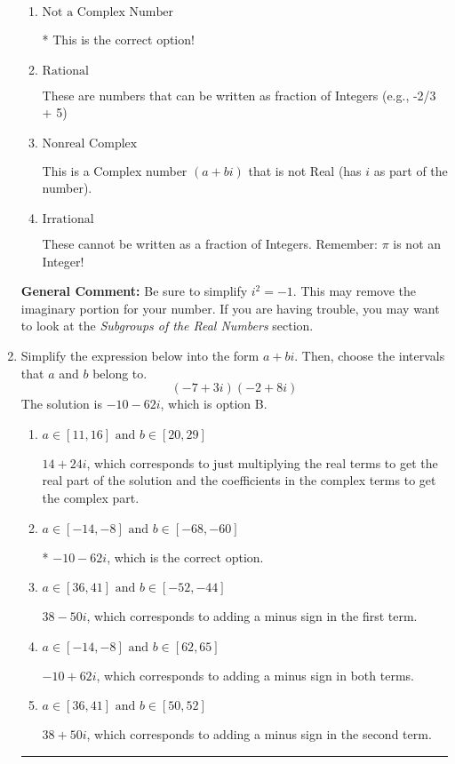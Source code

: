 \documentclass{extbook}[14pt]
\newcommand{\litem}[1]{\item #1

\rule{\textwidth}{0.4pt}}
\begin{document}
\begin{enumerate}
{\begin{enumerate}[label=\Alph*.]
This is a Complex number $(a+bi)$ that \textbf{only} has an imaginary part like $2i$.
\item \( \text{Not a Complex Number} \)

* This is the correct option!
\item \( \text{Rational} \)

These are numbers that can be written as fraction of Integers (e.g., -2/3 + 5)
\item \( \text{Nonreal Complex} \)

This is a Complex number $(a+bi)$ that is not Real (has $i$ as part of the number).
\item \( \text{Irrational} \)

These cannot be written as a fraction of Integers. Remember: $\pi$ is not an Integer!
\end{enumerate}

\textbf{General Comment:} Be sure to simplify $i^2 = -1$. This may remove the imaginary portion for your number. If you are having trouble, you may want to look at the \textit{Subgroups of the Real Numbers} section.
}
\litem{
Simplify the expression below into the form $a+bi$. Then, choose the intervals that $a$ and $b$ belong to.
\[ (-7 + 3 i)(-2 + 8 i) \]
The solution is \( -10 - 62 i \), which is option B.\begin{enumerate}[label=\Alph*.]
\item \( a \in [11, 16] \text{ and } b \in [20, 29] \)

 $14 + 24 i$, which corresponds to just multiplying the real terms to get the real part of the solution and the coefficients in the complex terms to get the complex part.
\item \( a \in [-14, -8] \text{ and } b \in [-68, -60] \)

* $-10 - 62 i$, which is the correct option.
\item \( a \in [36, 41] \text{ and } b \in [-52, -44] \)

 $38 - 50 i$, which corresponds to adding a minus sign in the first term.
\item \( a \in [-14, -8] \text{ and } b \in [62, 65] \)

 $-10 + 62 i$, which corresponds to adding a minus sign in both terms.
\item \( a \in [36, 41] \text{ and } b \in [50, 52] \)

 $38 + 50 i$, which corresponds to adding a minus sign in the second term.
\end{enumerate}

}
\end{enumerate}
\end{document}

